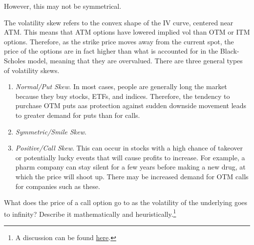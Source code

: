\documentclass{article}
\begin{document}
    However, this may not be symmetrical. 

    \begin{definition}
      \label{def:volatility-skew}
      The volatility skew refers to the convex shape of the IV curve, centered near ATM. This means that ATM options have lowered implied vol than OTM or ITM options. Therefore, as the strike price moves away from the current spot, the price of the options are in fact higher than what is accounted for in the Black-Scholes model, meaning that they are overvalued. There are three general types of volatility skews.

      \begin{enumerate}
        \item \textit{Normal/Put Skew}. In most cases, people are generally long the market because they buy stocks, ETFs, and indices. Therefore, the tendency to purchase OTM puts aas protection against sudden downside movement leads to greater demand for puts than for calls.
        \item \textit{Symmetric/Smile Skew}.
        \item \textit{Positive/Call Skew}. This can occur in stocks with a high chance of takeover or potentially lucky events that will cause profits to increase. For example, a pharm company can stay silent for a few years before making a new drug, at which the price will shoot up. There may be increased demand for OTM calls for companies such as these.
      \end{enumerate}
    \end{definition}

    \begin{exercise}
      What does the price of a call option go to as the volatility of the underlying goes to infinity? Describe it mathematically and heuristically.\footnote{A discussion can be found \href{https://quant.stackexchange.com/questions/39490/value-of-call-option-as-volatility-goes-to-infinity}{here}. } 
    \end{exercise}
\end{document}
